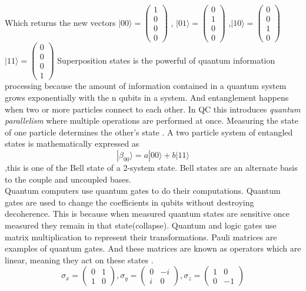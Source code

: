 \documentclass[15pt, a4paper]{Assignment}
\begin{document}
Which returns the new vectors $|00\rangle =	\begin{pmatrix}
	1\\0\\0\\0
\end{pmatrix}$ , $|01\rangle =	\begin{pmatrix}
0\\1\\0\\0
\end{pmatrix}$ ,$|10\rangle =	\begin{pmatrix}
0\\0\\1\\0
\end{pmatrix}$
$|11\rangle =	\begin{pmatrix}
	0\\0\\0\\1
\end{pmatrix}$
Superposition states is the powerful of quantum information processing because the 
amount of information contained in a quantum system grows exponentially with the n  qubits in a system.
And entanglement happens when two or more particles connect to each other.
In QC this introduces \textit{quantum parallelism} where multiple operations are performed at once.
Measuring the state of one particle determines the other's state \cite{mcintyre_quantum_2012}.
A two particle system of entangled states is mathematically expressed as \begin{equation}|\beta_{00} \rangle = a|00\rangle + b|11\rangle\end{equation}
,this is one of the Bell state of a 2-system state.
Bell states are an alternate basis to the couple and uncoupled bases\cite{mcintyre_quantum_2012}.\\
Quantum computers use quantum gates to do their computations\cite{AndrewSteane}.
Quantum gates are used to change the coefficients in qubits without destroying decoherence.
This is because when measured quantum states are sensitive once measured they remain in that state(collapse).
Quantum and logic gates use matrix multiplication to represent their transformations.
Pauli matrices are examples of quantum gates.
And these matrices are known as operators which are linear, meaning they act on these states \cite{AndrewSteane,mcintyre_quantum_2012}.
\begin{equation}
\sigma_x =\begin{pmatrix}
	0&1\\1&0
	\end{pmatrix},
	\sigma_y =\begin{pmatrix}
		0&-i\\i&0
	\end{pmatrix},\sigma_z =\begin{pmatrix}
	1&0\\0&-1
	\end{pmatrix}
\end{equation}
\end{document}
